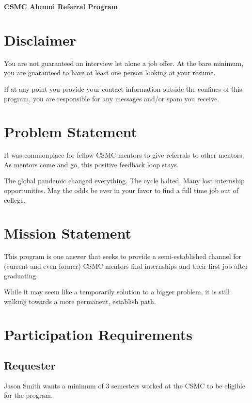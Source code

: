 \documentclass[letterpaper, 12pt]{article}
\newcommand{\minSemesters}{3}
\newcommand{\currentBoss}{Jason Smith}
\begin{document}
\begin{center}
    \bfseries\Large CSMC Alumni Referral Program
\end{center}

\section{Disclaimer}\label{section:disclaimer}

You are not guaranteed an interview let alone a job offer. At the bare minimum,
you are guaranteed to have at least one person looking at your resume.

If at any point you provide your contact information outside the confines of
this program, you are responsible for any messages and/or spam you
receive.\label{section:disclaimer:spamMessages}

\section{Problem Statement}

It was commonplace for fellow CSMC mentors to give referrals to other mentors.
As mentors come and go, this positive feedback loop stays.

The global pandemic changed everything. The cycle halted. Many lost internship
opportunities. May the odds be ever in your favor to find a full time job out of
college.

\section{Mission Statement}

This program is one answer that seeks to provide a semi-established channel for
(current and even former) CSMC mentors find internships and their first job after
graduating.

While it may seem like a temporarily solution to a bigger problem, it is still
walking towards a more permanent, establish path.

\section{Participation Requirements}

\subsection{Requester}

\currentBoss{} wants a minimum of \minSemesters{} semesters  worked at the CSMC
to be eligible for the program.
\end{document}
